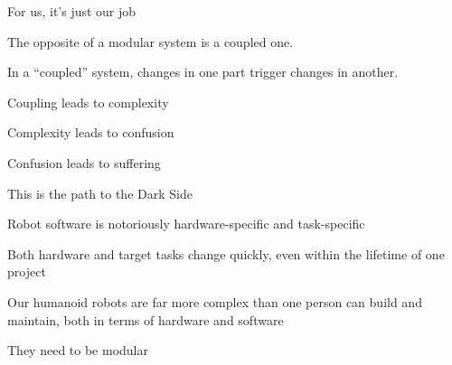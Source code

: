 For us, it's just our job


The opposite of a modular system is a coupled one.

In a ``coupled'' system, changes in one part trigger changes in another.

Coupling leads to complexity

Complexity leads to confusion

Confusion leads to suffering

This is the path to the Dark Side

Robot software is notoriously hardware-specific and task-specific

Both hardware and target tasks change quickly, even within the
lifetime of one project

Our humanoid robots are far more complex than one person can build and
maintain, both in terms of hardware and software

They need to be modular



